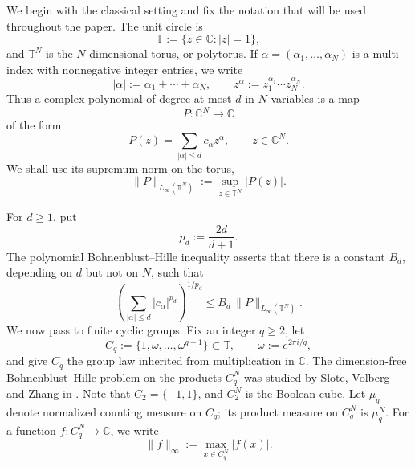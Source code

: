 \documentclass[11pt,a4paper]{article}
\numberwithin{equation}{section}
\theoremstyle{cleanplain}
\theoremstyle{cleandefinition}
\theoremstyle{cleanremark}
\newcommand{\T}{\mathbb T}
\newcommand{\C}{\mathbb C}
\begin{document}
We begin with the classical setting and fix the notation that will be used
throughout the paper.  The unit circle is
\begin{equation}\label{eq:torus-intro}
 \T:=\{z\in\C:|z|=1\},
\end{equation}
and $\T^N$ is the $N$-dimensional torus, or polytorus.  If
$\alpha=(\alpha_1,\ldots,\alpha_N)$ is a multi-index with nonnegative
integer entries, we write
\[
 |\alpha|:=\alpha_1+\cdots+\alpha_N,
 \qquad
 z^\alpha:=z_1^{\alpha_1}\cdots z_N^{\alpha_N}.
\]
Thus a complex polynomial of degree at most $d$ in $N$ variables is a map
\[
 P:\C^N\longrightarrow\C
\]
of the form
\[
 P(z)=\sum_{|\alpha|\leq d}c_\alpha z^\alpha,
 \qquad z\in\C^N.
\]
We shall use its supremum norm on the torus,
\begin{equation}\label{eq:torus-supnorm-intro}
 \|P\|_{L_\infty(\T^N)}
 :=\sup_{z\in\T^N}|P(z)|.
\end{equation}

For $d\geq1$, put
\begin{equation}\label{eq:pd-intro}
 p_d:=\frac{2d}{d+1}.
\end{equation}
The polynomial Bohnenblust--Hille inequality \cite{BH} asserts that there is a
constant $B_d$, depending on $d$ but not on $N$, such that
\begin{equation}\label{eq:classical-BH-intro}
 \left(\sum_{|\alpha|\leq d}|c_\alpha|^{p_d}\right)^{1/p_d}
 \leq B_d\,\|P\|_{L_\infty(\T^N)}.
\end{equation}
We now pass to finite cyclic groups.  Fix an integer $q\geq2$, let
\begin{equation}\label{eq:Cq-intro}
 C_q:=\{1,\omega,\ldots,\omega^{q-1}\}\subset\T,
 \qquad \omega:=e^{2\pi i/q},
\end{equation}
and give $C_q$ the group law inherited from multiplication in $\C$.
The dimension-free Bohnenblust--Hille problem on the products $C_q^N$ was
studied by Slote, Volberg and Zhang in \cite{SVZ}.  {\color{black}Note that} $C_2=\{-1,1\}$, and $C_2^N$ is the Boolean cube.  Let
$\mu_q$ denote normalized counting measure on $C_q$; its product measure on
$C_q^N$ is $\mu_q^N$.  For a function $f:C_q^N\to\C$, we write
\begin{equation}\label{eq:cyclic-supnorm-intro}
 \|f\|_\infty:=\max_{x\in C_q^N}|f(x)|.
\end{equation}
\end{document}
